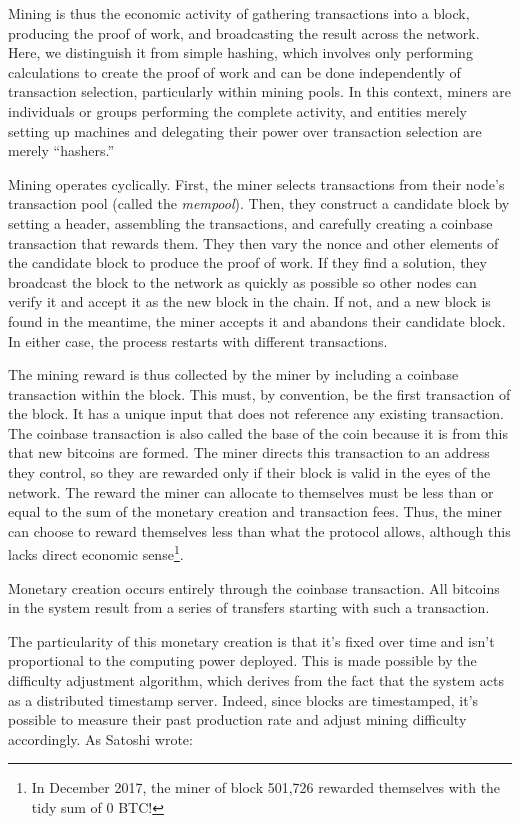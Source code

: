 \documentclass[
  a5paper,
  smalldemyvopaper,10pt,twoside,onecolumn,openright,extrafontsizes,hidelinks]{memoir}
\begin{document}
Mining is thus the economic activity of gathering transactions into a
block, producing the proof of work, and broadcasting the result across
the network. Here, we distinguish it from simple hashing, which involves
only performing calculations to create the proof of work and can be done
independently of transaction selection, particularly within mining
pools. In this context, miners are individuals or groups performing the
complete activity, and entities merely setting up machines and
delegating their power over transaction selection are merely
``hashers.''

Mining operates cyclically. First, the miner selects transactions from
their node's transaction pool (called the \emph{mempool}). Then, they
construct a candidate block by setting a header, assembling the
transactions, and carefully creating a coinbase transaction that rewards
them. They then vary the nonce and other elements of the candidate block
to produce the proof of work. If they find a solution, they broadcast
the block to the network as quickly as possible so other nodes can
verify it and accept it as the new block in the chain. If not, and a new
block is found in the meantime, the miner accepts it and abandons their
candidate block. In either case, the process restarts with different
transactions.

The mining reward is thus collected by the miner by including a coinbase
transaction within the block. This must, by convention, be the first
transaction of the block. It has a unique input that does not reference
any existing transaction. The coinbase transaction is also called the
base of the coin because it is from this that new bitcoins are formed.
The miner directs this transaction to an address they control, so they
are rewarded only if their block is valid in the eyes of the network.
The reward the miner can allocate to themselves must be less than or
equal to the sum of the monetary creation and transaction fees. Thus,
the miner can choose to reward themselves less than what the protocol
allows, although this lacks direct economic sense\footnote{In December
  2017, the miner of block 501,726 rewarded themselves with the tidy sum
  of 0 BTC!}.

Monetary creation occurs entirely through the coinbase transaction. All
bitcoins in the system result from a series of transfers starting with
such a transaction.

The particularity of this monetary creation is that it's fixed over time
and isn't proportional to the computing power deployed. This is made
possible by the difficulty adjustment algorithm, which derives from the
fact that the system acts as a distributed timestamp server. Indeed,
since blocks are timestamped, it's possible to measure their past
production rate and adjust mining difficulty accordingly. As Satoshi
wrote:
\end{document}
